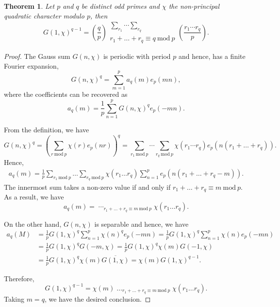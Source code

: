 \documentclass[12pt]{article}
\theoremstyle{thmstyle}
\newtheorem{theorem}{Theorem}[section]
\theoremstyle{defstyle}
\renewcommand{\mod}{~\mathrm{mod}~}
\begin{document}
\begin{theorem}
    Let $p$ and $q$ be distinct odd primes and $\chi$ the non-principal quadratic character modulo $p$, then 
    \begin{equation*}
        G(1,\chi)^{q - 1} = \left(\frac{q}{p}\right)\substack{\displaystyle\sum_{r_1}\cdots\sum_{r_q}\\r_1 + \dots + r_q\equiv q\mod p}\left(\frac{r_1\cdots r_q}{p}\right).
    \end{equation*}
\end{theorem}
\begin{proof}
    The Gauss sum $G(n,\chi)$ is periodic with period $p$ and hence, has a finite Fourier expansion, 
    \begin{equation*}
        G(n,\chi)^q = \sum_{m = 1}^{p} a_q(m)e_p(mn),
    \end{equation*}
    where the coefficients can be recovered as 
    \begin{equation*}
        a_q(m) = \frac{1}{p}\sum_{n = 1}^p G(n,\chi)^qe_p(-mn).
    \end{equation*}

    From the definition, we have 
    \begin{equation*}
        G(n,\chi)^q = \left(\sum_{r\mod p}\chi(r)e_p(nr)\right)^q = \sum_{r_1\mod p}\cdots\sum_{r_q\mod p}\chi(r_1\cdots r_q)e_p(n(r_1 + \dots + r_q)).
    \end{equation*}
    Hence, 
    \begin{align*}
        a_q(m) = \frac{1}{p}\sum_{r_1\mod p}\dots\sum_{r_q\mod p}\chi(r_1\dots r_q)\sum_{n = 1}^p e_p(n(r_1 + \dots + r_q - m)).
    \end{align*}
    The innermost sum takes a non-zero value if and only if $r_1 + \dots + r_q\equiv m\mod p$. As a result, we have 
    \begin{equation*}
        a_q(m) = \mathop{\displaystyle\sum_{r_1}\cdots\sum_{r_q}}_{r_1 + \dots + r_q\equiv m\mod p}\chi(r_1\dots r_q).
    \end{equation*}

    On the other hand, $G(n,\chi)$ is separable and hence, we have 
    \begin{align*}
        a_q(M) &= \frac{1}{p}G(1,\chi)^{q}\sum_{n = 1}^p \chi(n)^q e_p(-mn) = \frac{1}{p}G(1,\chi)^q\sum_{n = 1}^p \chi(n)e_p(-mn)\\
        &= \frac{1}{p}G(1,\chi)^q G(-m,\chi) = \frac{1}{p}G(1,\chi)^q\chi(m)G(-1,\chi)\\
        &= \frac{1}{p}G(1,\chi)^q\chi(m)\overline{G(1,\chi)} = \chi(m)G(1,\chi)^{q - 1}.
    \end{align*}

    Therefore, 
    \begin{equation*}
        G(1,\chi)^{q - 1} = \chi(m)\mathop{\sum_{r_1}\dots\sum_{r_q}}_{r_1 + \dots + r_q\equiv m\mod p}\chi(r_1\dots r_q).
    \end{equation*}
    Taking $m = q$, we have the desired conclusion.
\end{proof}
\end{document}
